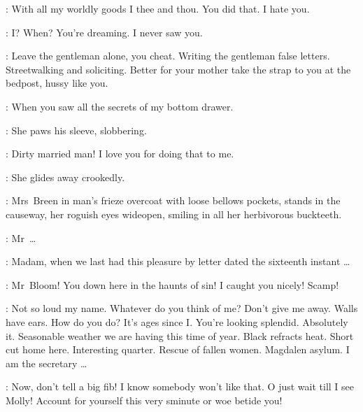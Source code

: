 \Gerty:
With all my worldly goods I thee and thou.
 You did that.
I hate you.

\Bloom:
I? When?
You're dreaming.
I never saw you.

\Bawd:
Leave the gentleman alone, you cheat.
Writing the gentleman false letters.
Streetwalking and soliciting.
Better for your mother
take the strap to you at the bedpost, hussy like you.

\Gerty:
When you saw all the secrets of my bottom drawer.

:
She paws his sleeve, slobbering.

\Gerty:
Dirty married man!
I love you for doing that to me.

:
She glides away crookedly.

:
Mrs~Breen in man's frieze overcoat with loose bellows pockets,
stands in the causeway, her roguish eyes wideopen,
smiling in all her herbivorous buckteeth.

\MrsBreen:
Mr~\ldots
{}

\Bloom:
Madam, when we last had this pleasure by letter dated the sixteenth instant \ldots

\MrsBreen:
Mr~Bloom! You down here in the haunts of sin!
I caught you nicely! Scamp!

\Bloom:
Not so loud my name.
Whatever do you think of me?
Don't give me away.
Walls have ears.
How do you do? It's ages since I.
You're looking splendid.
Absolutely it.
Seasonable weather we are having this time of year.
Black refracts heat.
Short cut home here.
Interesting quarter.
Rescue of fallen women.
Magdalen asylum.
I am the secretary \ldots

\MrsBreen:
Now, don't tell a big fib!
I know somebody won't like that.
O just wait till I see Molly!
Account for yourself this very sminute or woe betide you!

